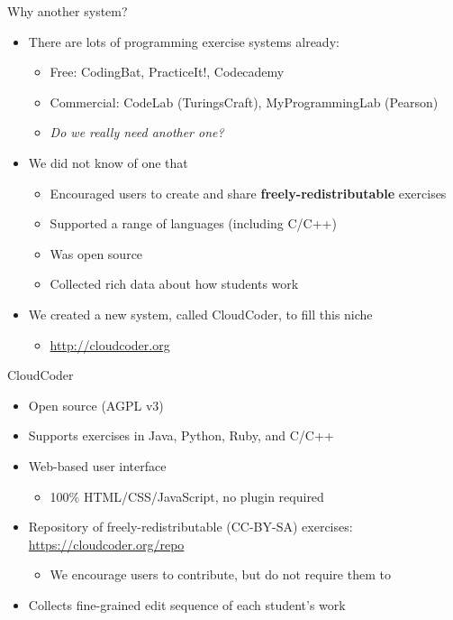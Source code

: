 \documentclass{beamer}
\begin{document}
\begin{frame}{Why another system?}

\begin{itemize}
  \item There are lots of programming exercise systems already:
  \begin{itemize}
    \item Free: CodingBat, PracticeIt!, Codecademy
    \item Commercial: CodeLab (TuringsCraft), MyProgrammingLab (Pearson)
    \item {\em Do we really need another one?}
  \end{itemize}
  \item We did not know of one that
  \begin{itemize}
    \item Encouraged users to create and share {\bf freely-redistributable} exercises
    \item Supported a range of languages (including C/C++)
    \item Was open source
    \item Collected rich data about how students work
  \end{itemize}
  \item We created a new system, called CloudCoder, to fill this niche
    \begin{itemize}
    \item \url{http://cloudcoder.org}
    \end{itemize}
\end{itemize}

\end{frame}

\begin{frame}{CloudCoder}

\begin{itemize}
  \item Open source (AGPL v3)
  \item Supports exercises in Java, Python, Ruby, and C/C++
  \item Web-based user interface
    \begin{itemize}
    \item 100\% HTML/CSS/JavaScript, no plugin required
    \end{itemize}
  \item Repository of freely-redistributable (CC-BY-SA) exercises:
        \url{https://cloudcoder.org/repo}
    \begin{itemize}
    \item We encourage users to contribute, but do not require them to
    \end{itemize}
  \item Collects fine-grained edit sequence of each student's work
\end{itemize}

\end{frame}
\end{document}
